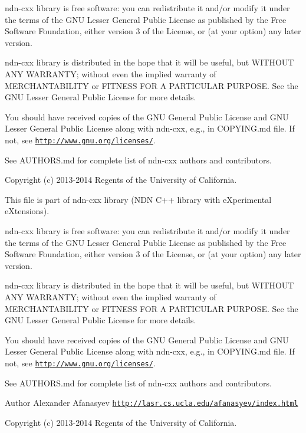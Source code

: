ndn-\/cxx library is free software\+: you can redistribute it and/or modify it under the terms of the G\+NU Lesser General Public License as published by the Free Software Foundation, either version 3 of the License, or (at your option) any later version.

ndn-\/cxx library is distributed in the hope that it will be useful, but W\+I\+T\+H\+O\+UT A\+NY W\+A\+R\+R\+A\+N\+TY; without even the implied warranty of M\+E\+R\+C\+H\+A\+N\+T\+A\+B\+I\+L\+I\+TY or F\+I\+T\+N\+E\+SS F\+OR A P\+A\+R\+T\+I\+C\+U\+L\+AR P\+U\+R\+P\+O\+SE. See the G\+NU Lesser General Public License for more details.

You should have received copies of the G\+NU General Public License and G\+NU Lesser General Public License along with ndn-\/cxx, e.\+g., in C\+O\+P\+Y\+I\+N\+G.\+md file. If not, see \href{http://www.gnu.org/licenses/}{\tt http\+://www.\+gnu.\+org/licenses/}.

See A\+U\+T\+H\+O\+R\+S.\+md for complete list of ndn-\/cxx authors and contributors.

Copyright (c) 2013-\/2014 Regents of the University of California.

This file is part of ndn-\/cxx library (N\+DN C++ library with e\+Xperimental e\+Xtensions).

ndn-\/cxx library is free software\+: you can redistribute it and/or modify it under the terms of the G\+NU Lesser General Public License as published by the Free Software Foundation, either version 3 of the License, or (at your option) any later version.

ndn-\/cxx library is distributed in the hope that it will be useful, but W\+I\+T\+H\+O\+UT A\+NY W\+A\+R\+R\+A\+N\+TY; without even the implied warranty of M\+E\+R\+C\+H\+A\+N\+T\+A\+B\+I\+L\+I\+TY or F\+I\+T\+N\+E\+SS F\+OR A P\+A\+R\+T\+I\+C\+U\+L\+AR P\+U\+R\+P\+O\+SE. See the G\+NU Lesser General Public License for more details.

You should have received copies of the G\+NU General Public License and G\+NU Lesser General Public License along with ndn-\/cxx, e.\+g., in C\+O\+P\+Y\+I\+N\+G.\+md file. If not, see \href{http://www.gnu.org/licenses/}{\tt http\+://www.\+gnu.\+org/licenses/}.

See A\+U\+T\+H\+O\+R\+S.\+md for complete list of ndn-\/cxx authors and contributors.

\begin{DoxyAuthor}{Author}
Alexander Afanasyev \href{http://lasr.cs.ucla.edu/afanasyev/index.html}{\tt http\+://lasr.\+cs.\+ucla.\+edu/afanasyev/index.\+html}
\end{DoxyAuthor}
Copyright (c) 2013-\/2014 Regents of the University of California.

